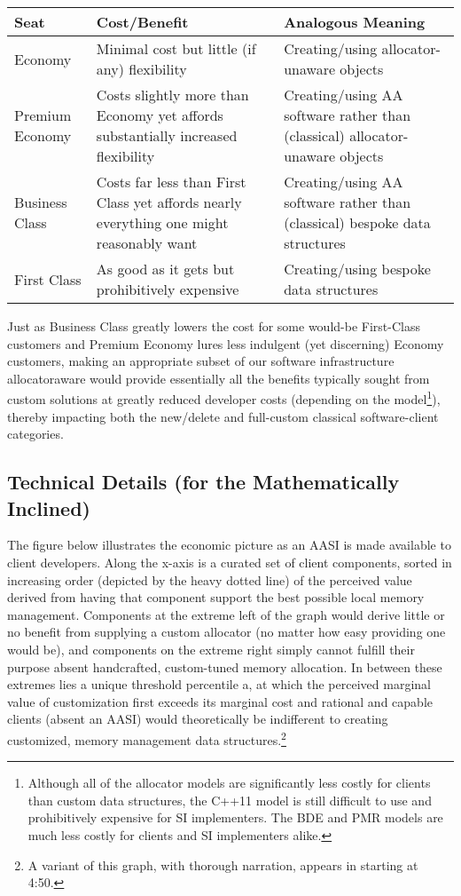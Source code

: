\begin{center}
\begin{tabular}{| p{} p{} p{} |}
\hline 
Seat & Cost/Benefit & Analogous Meaning \\
\hline
Economy & Minimal cost but little (if any) flexibility & Creating/using allocator-unaware objects \\
\hline
\hline
Premium Economy & Costs slightly more than Economy yet affords substantially increased flexibility & Creating/using AA software rather than (classical) allocator-unaware objects \\
Business Class & Costs far less than First Class yet affords nearly everything one might reasonably want & Creating/using AA software rather than (classical) bespoke data structures \\
\hline
\hline
First Class & As good as it gets but prohibitively expensive & Creating/using bespoke data structures \\
\hline
\end{tabular}
\end{center}

Just as Business Class greatly lowers the cost for some would-be First-Class
customers and Premium Economy lures less indulgent (yet discerning) Economy
customers, making an appropriate subset of our software infrastructure allocatoraware would provide essentially all the benefits typically sought from custom
solutions at greatly reduced developer costs (depending on the model\footnote{Although all of the allocator models are significantly less costly for clients than custom data
structures, the C++11 model is still difficult to use and prohibitively expensive for SI implementers.
The BDE and PMR models are much less costly for clients and SI implementers alike.}), thereby
impacting both the new/delete and full-custom classical software-client categories.

\subsection{Technical Details (for the Mathematically Inclined)}
The figure below illustrates the economic picture as an AASI is made available to
client developers. Along the x-axis is a curated set of client components, sorted in
increasing order (depicted by the heavy dotted line) of the perceived value derived
from having that component support the best possible local memory management.
Components at the extreme left of the graph would derive little or no benefit from
supplying a custom allocator (no matter how easy providing one would be), and
components on the extreme right simply cannot fulfill their purpose absent
handcrafted, custom-tuned memory allocation. In between these extremes lies a
unique threshold percentile a, at which the perceived marginal value of
customization first exceeds its marginal cost and rational and capable clients
(absent an AASI) would theoretically be indifferent to creating customized,
memory management data structures.\footnote{A variant of this graph, with
thorough narration, appears in \cite{lakos19} starting at 4:50.}


